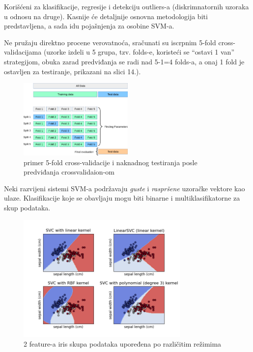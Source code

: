 \documentclass[fontsize=12bp, paper=a4]{scrarticle}
\begin{document}
Korišćeni za klasifikacije, regresije i detekciju outliers-a (diskrimnatornih uzoraka u odnosu na druge). Kasnije će detaljnije osnovna metodologija biti predstavljena, a sada idu pojašnjenja za osobine SVM-a.

Ne pružaju direktno procene verovatnoća, sračunati su iscrpnim 5-fold cross-validacijama (uzorke izdeli u 5 grupa, tzv. folds-e, koristeći se ``ostavi 1 van'' strategijom, obuka zarad predviđanja se radi nad 5-1=4 folds-a, a onaj 1 fold je ostavljen za testiranje, prikazani na slici 14.)\cite{cv}.

\begin{figure}[h!]
    \centering
    \includegraphics[width=0.5\textwidth]{image-20.png}
    \caption{\centering primer 5-fold cross-validacije i naknadnog testiranja posle predviđanja crossvalidaion-om}
\end{figure}

Neki razvijeni sistemi SVM-a podržavaju \textit{guste} i \textit{raspršene} uzoračke vektore kao ulaze. 
Klasifikacije koje se obavljaju mogu biti binarne i multiklasifikatorne za skup podataka.

\begin{figure}[h!]
    \centering
    \includegraphics[width=0.75\textwidth]{image-13.png}
    \caption{2 feature-a iris skupa podataka upoređena po različitim režimima}
\end{figure}
\end{document}
